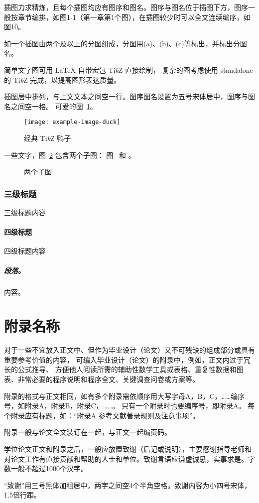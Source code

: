 \documentclass[fontset = mac ms]{seuthesis2024b}
\begin{document}
      插图力求精炼，且每个插图均应有图序和图名。图序与图名位于插图下方，图序一般按章节编排，如图1-1（第一章第1个图），在插图较少时可以全文连续编序，如图10。
      
      如一个插图由两个及以上的分图组成，分图用(a)、(b)、(c)等标出，并标出分图名。

      简单文字图可用 \LaTeX{} 自带宏包 Ti\textit{k}Z 直接绘制，
      复杂的图考虑使用 standalone 的 Ti\textit{k}Z 完成，以提高图形表达质量。

      插图居中排列，与上文文本之间空一行。图序图名设置为五号宋体居中，图序与图名之间空一格。
      可爱的图~\ref{fig:duck}。

      \begin{figure}[htbp]
        \centering
        \texttt{[image: example-image-duck]}
        \caption{经典 Ti\textit{k}Z 鸭子}
        \label{fig:duck}
      \end{figure}

      一些文字，图~\ref{fig:subfigs} 包含两个子图：
      图~ 和 。

      \begin{figure}[htbp]
        \hfill
        \caption{两个子图}
        \label{fig:subfigs}
      \end{figure}

      \subsection{三级标题}
        三级标题内容
        \subsubsection{四级标题}
        四级标题内容
        \paragraph{段落。}内容。

  \appendix
  \chapter{附录名称}
    对于一些不宜放入正文中、但作为毕业设计（论文）又不可残缺的组成部分或具有重要参考价值的内容，
    可编入毕业设计（论文）的附录中，例如，正文内过于冗长的公式推导、
    方便他人阅读所需的辅助性数学工具或表格、重复性数据和图表、非常必要的程序说明和程序全文、关键调查问卷或方案等。

    附录的格式与正文相同，如有多个附录需依顺序用大写字母A，B，C，……编序号，如附录A，附录B，附录C，……。
    只有一个附录时也要编序号，即附录A。
    每个附录应有标题，如：“附录A 参考文献著录规则及注意事项”。

    附录一般与论文全文装订在一起，与正文一起编页码。
  
  \chapterAck
    学位论文正文和附录之后，一般应放置致谢（后记或说明），主要感谢指导老师和对论文工作有直接贡献和帮助的人士和单位。致谢言语应谦虚诚恳，实事求是。字数一般不超过1000个汉字。

    “致谢”用三号黑体加粗居中，两字之间空4个半角空格。致谢内容为小四号宋体，1.5倍行距。
  
\end{document}
